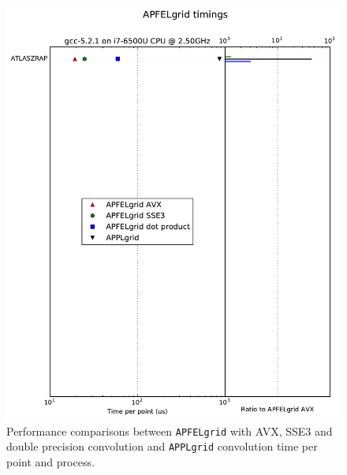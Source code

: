 \documentclass[preprint,12pt]{elsarticle}
\begin{document}
\begin{figure}[h]
\centering
\includegraphics[scale=0.4]{plots/t0}
\caption{\small Performance comparisons between {\tt APFELgrid} with
  AVX, SSE3 and double precision convolution and {\tt APPLgrid}
  convolution time per point and process.}
\label{fig:benchmark}
\end{figure}





\end{document}
